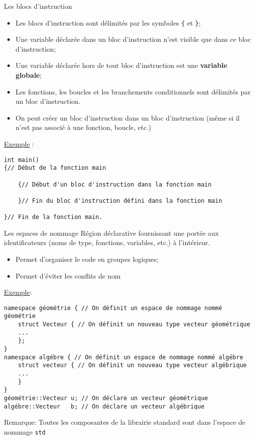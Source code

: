 \documentclass[compress,10pt,aspectratio=169]{beamer}
\begin{document}
\begin{frame}[fragile]{Les blocs d'instruction}
    \scriptsize 
    \begin{itemize}
        \item Les blocs d'instruction sont délimités par les symboles \texttt{\{} et \texttt{\}};
        \item Une variable déclarée dans un bloc d'instruction n'est visible que dans ce bloc d'instruction;
        \item Une variable déclarée hors de tout bloc d'instruction est une \textbf{variable globale};
        \item Les fonctions, les boucles et les branchements conditionnels sont délimités par un bloc d'instruction.
        \item On peut créer un bloc d'instruction dans un bloc d'instruction (même si il n'est pas associé à une fonction, boucle, etc.)
    \end{itemize}

\underline{Exemple} :
\begin{verbatim}
int main()
{// Début de la fonction main

    {// Début d'un bloc d'instruction dans la fonction main

    }// Fin du bloc d'instruction défini dans la fonction main

}// Fin de la fonction main.
\end{verbatim}
\end{frame}

\begin{frame}[fragile]{Les espaces de nommage}
    \scriptsize
    Région déclarative fournissant une portée aux identificateurs (noms de type, fonctions, variables, etc.) à l'intérieur.

    \begin{itemize}
    \item Permet d'organiser le code en groupes logiques;
    \item Permet d'éviter les conflits de nom 
    \end{itemize}

    \underline{Exemple}:
    \begin{verbatim}
namespace géométrie { // On définit un espace de nommage nommé géométrie
    struct Vecteur { // On définit un nouveau type vecteur géométrique
    ... 
    };
}
namespace algébre { // On définit un espace de nommage nommé algébre
    struct vecteur { // On définit un nouveau type vecteur algébrique
    ...
    }
}
géométrie::Vecteur u; // On déclare un vecteur géométrique
algébre::Vecteur   b; // On déclare un vecteur algébrique
    \end{verbatim}

    \alert{Remarque}: Toutes les composantes de la librairie standard sont dans l'espace de nommage \texttt{std}
\end{frame}
\end{document}
